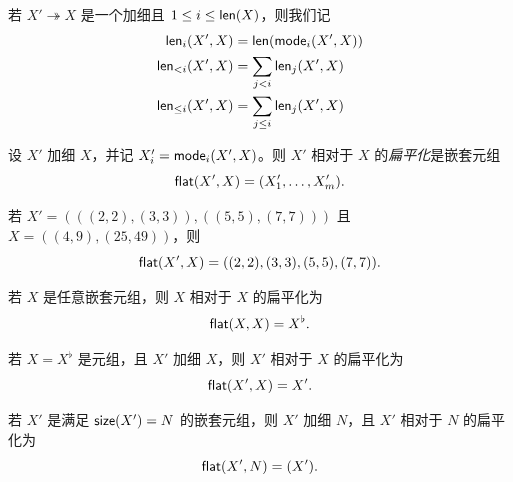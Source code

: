 \begin{notation}
    若 $X' \twoheadrightarrow X$ 是一个加细且 $1 \leq i \leq \mathsf{len}(X)$，则我们记
    \begin{align*}
    \mathsf{len}_i(X',X) & = \mathsf{len}(\mathsf{mode}_i(X',X))\\
    \mathsf{len}_{<i}(X',X) & = \sum_{j < i} \mathsf{len}_j(X',X)\\
    \mathsf{len}_{\leq i}(X',X) & = \sum_{j \leq i} \mathsf{len}_j(X',X)
    \end{align*}
\end{notation}








\begin{definition}
    设 $X'$ 加细 $X$，并记 $X_i' = \mathsf{mode}_i(X',X)$。则 $X'$ 相对于 $X$ 的{\it 扁平化}是嵌套元组
    \[
    \mathsf{flat}(X',X) = (X_1',\dots,X_m').
    \]
\end{definition}

\begin{example}
若 $X' = (((2,2),(3,3)),((5,5),(7,7)))$ 且 $X = ((4,9),(25,49))$，则
\[
\mathsf{flat}(X',X) = ((2,2),(3,3),(5,5),(7,7)).
\]
\end{example}

\begin{example}
    若 $X$ 是任意嵌套元组，则 $X$ 相对于 $X$ 的扁平化为
    \[
    \mathsf{flat}(X,X) = X^\flat.
    \]
\end{example}

\begin{example}
    若 $X = X^\flat$ 是元组，且 $X'$ 加细 $X$，则 $X'$ 相对于 $X$ 的扁平化为
    \[
    \mathsf{flat}(X',X) = X'.
    \]
\end{example}

\begin{example}
    若 $X'$ 是满足 $\mathsf{size}(X') = N$ 的嵌套元组，则 $X'$ 加细 $N$，且 $X'$ 相对于 $N$ 的扁平化为
    \[
    \mathsf{flat}(X',N) = (X').
    \]
\end{example}

